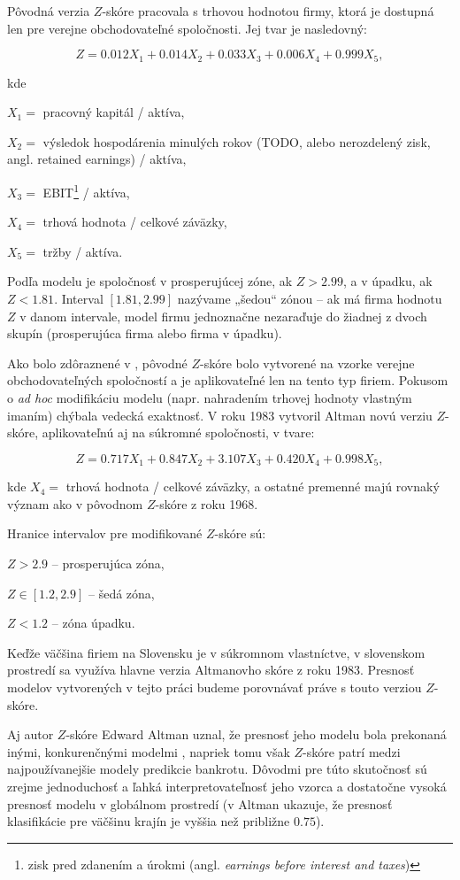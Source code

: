 Pôvodná verzia \(Z\)-skóre pracovala s trhovou hodnotou firmy, ktorá je dostupná len pre verejne obchodovateľné spoločnosti. Jej tvar je nasledovný:

\[
    Z = 0.012X_1 + 0.014X_2 + 0.033X_3 + 0.006X_4 + 0.999X_5,
\]

kde

\(X_1 = \) pracovný kapitál / aktíva,

\(X_2 = \) výsledok hospodárenia minulých rokov (TODO, alebo nerozdelený zisk, angl. retained earnings) / aktíva,

\(X_3 = \) EBIT\footnote{zisk pred zdanením a úrokmi (angl. \emph{earnings before interest and taxes})} / aktíva,

\(X_4 = \) trhová hodnota / celkové záväzky,

\(X_5 = \) tržby / aktíva.
\bigskip

Podľa modelu je spoločnosť v prosperujúcej zóne, ak \(Z > 2.99\), a v úpadku, ak \(Z < 1.81\).
Interval \([1.81, 2.99]\) nazývame „šedou“ zónou – ak má firma hodnotu \(Z\) v danom intervale, model firmu jednoznačne nezaraďuje do žiadnej z dvoch skupín
(prosperujúca firma alebo firma v úpadku).

Ako bolo zdôraznené v \cite{altman1983}, pôvodné \(Z\)-skóre bolo vytvorené na vzorke verejne obchodovateľných spoločností a je aplikovateľné len na tento typ firiem.
Pokusom o \emph{ad hoc} modifikáciu modelu (napr. nahradením trhovej hodnoty vlastným imaním) chýbala vedecká exaktnosť.
V roku 1983 vytvoril Altman novú verziu \(Z\)-skóre, aplikovateľnú aj na súkromné spoločnosti, v tvare:

\[
    Z = 0.717X_1 + 0.847X_2 + 3.107X_3 + 0.420X_4 + 0.998X_5,
\]

kde \(X_4 = \) trhová hodnota / celkové záväzky, a ostatné premenné majú rovnaký význam ako v pôvodnom \(Z\)-skóre z roku 1968.

Hranice intervalov pre modifikované \(Z\)-skóre sú:

\( Z > 2.9\) – prosperujúca zóna,

\( Z \in [1.2, 2.9]\) – šedá zóna,

\( Z < 1.2 \) – zóna úpadku.
\bigskip

Keďže väčšina firiem na Slovensku je v súkromnom vlastníctve, v slovenskom prostredí sa využíva hlavne verzia Altmanovho skóre z roku 1983.
Presnosť modelov vytvorených v tejto práci budeme porovnávať práve s touto verziou \(Z\)-skóre.

Aj autor \(Z\)-skóre Edward Altman uznal, že presnosť jeho modelu bola prekonaná inými, konkurenčnými modelmi \cite{altman2017}, napriek tomu však \(Z\)-skóre patrí medzi najpoužívanejšie modely predikcie bankrotu.
Dôvodmi pre túto skutočnosť sú zrejme jednoduchosť a ľahká interpretovateľnosť jeho vzorca a dostatočne vysoká presnosť modelu v globálnom prostredí
(v \cite{altman2017} Altman ukazuje, že presnosť klasifikácie pre väčšinu krajín je vyššia než približne \(0.75\)).


